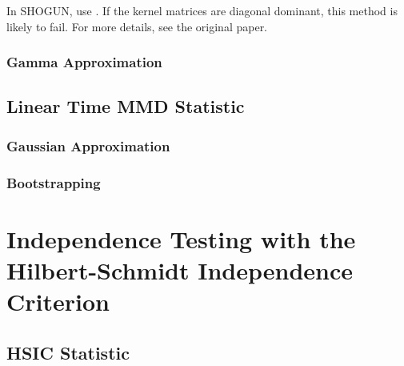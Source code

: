 In SHOGUN, use . If the kernel matrices are diagonal dominant, this method is likely to fail. For more details, see the original paper.
\subsubsection{Gamma Approximation}


\subsection{Linear Time MMD Statistic}
\label{sec:mmd_linear}
\subsubsection{Gaussian Approximation}
\subsubsection{Bootstrapping}

\section{Independence Testing with the Hilbert-Schmidt Independence Criterion}
\label{sec:independence_testing_into}

\subsection{HSIC Statistic}
\label{sec:hsic_test}